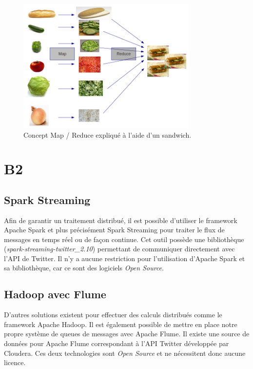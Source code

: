   \begin{figure}
    \centering
    \includegraphics[width=0.8\textwidth]{images/mapreduce.png}
    \caption{Concept Map / Reduce expliqué à l'aide d'un sandwich.}
    \label{mapreduce}
  \end{figure}

\section{B2}
\label{sec:B2}
  \subsection{Spark Streaming}
  Afin de garantir un traitement distribué, il est possible d'utiliser le framework Apache Spark et plus précisément Spark Streaming pour traiter le flux de messages en temps réel ou de façon continue. Cet outil possède une bibliothèque (\emph{spark-streaming-twitter\_2.10}) permettant de communiquer directement avec l'API de Twitter. Il n'y a aucune restriction pour l'utilisation d'Apache Spark et sa bibliothèque, car ce sont des logiciels \emph{Open Source}.

  \subsection{Hadoop avec Flume}
  \label{sub:Hadoop avec Flume}
  D'autres solutions existent pour effectuer des calculs distribués comme le framework Apache Hadoop. Il est également possible de mettre en place notre propre système de queues de messages avec Apache Flume. Il existe une source de données pour Apache Flume correspondant à l'API Twitter développée par Cloudera. Ces deux technologies sont \emph{Open Source} et ne nécessitent donc aucune licence.

